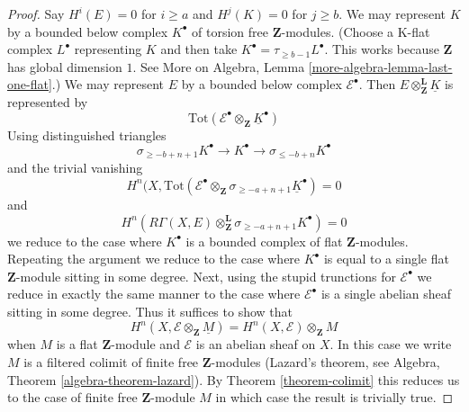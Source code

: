\documentclass[10pt,a4paper]{amsart}
\theoremstyle{plain}
\theoremstyle{definition}
\theoremstyle{remark}
\numberwithin{equation}{subsection}
\begin{document}
\begin{proof}
Say $H^i(E) = 0$ for $i \geq a$ and $H^j(K) = 0$ for $j \geq b$.
We may represent $K$ by a bounded below complex
$K^\bullet$ of torsion free $\mathbf{Z}$-modules.
(Choose a K-flat complex $L^\bullet$ representing $K$ and then
take $K^\bullet = \tau_{\geq b - 1}L^\bullet$. This works because
$\mathbf{Z}$ has global dimension $1$. See
More on Algebra, Lemma \ref{more-algebra-lemma-last-one-flat}.)
We may represent $E$ by a bounded below complex
$\mathcal{E}^\bullet$.
Then $E \otimes_\mathbf{Z}^\mathbf{L} \underline{K}$ is
represented by
$$
\text{Tot}(\mathcal{E}^\bullet \otimes_\mathbf{Z} \underline{K}^\bullet)
$$
Using distinguished triangles
$$
\sigma_{\geq -b + n + 1}K^\bullet
\to K^\bullet \to
\sigma_{\leq -b + n}K^\bullet
$$
and the trivial vanishing
$$
H^n(X,
\text{Tot}(\mathcal{E}^\bullet \otimes_\mathbf{Z}
\sigma_{\geq -a + n + 1}\underline{K}^\bullet) = 0
$$
and
$$
H^n(R\Gamma(X, E)
\otimes_\mathbf{Z}^\mathbf{L} \sigma_{\geq -a + n + 1}K^\bullet) = 0
$$
we reduce to the case where $K^\bullet$ is a bounded complex of
flat $\mathbf{Z}$-modules. Repeating the argument we reduce to the
case where $K^\bullet$ is equal to a single flat $\mathbf{Z}$-module
sitting in some degree. Next, using the stupid
trunctions for $\mathcal{E}^\bullet$
we reduce in exactly the same manner to the case where
$\mathcal{E}^\bullet$ is a single abelian sheaf sitting
in some degree. Thus it suffices to show that
$$
H^n(X, \mathcal{E} \otimes_\mathbf{Z} \underline{M}) =
H^n(X, \mathcal{E}) \otimes_\mathbf{Z} M
$$
when $M$ is a flat $\mathbf{Z}$-module and $\mathcal{E}$
is an abelian sheaf on $X$. In this case we
write $M$ is a filtered colimit of finite free $\mathbf{Z}$-modules
(Lazard's theorem, see Algebra, Theorem \ref{algebra-theorem-lazard}).
By Theorem \ref{theorem-colimit} this reduces us to the case of finite free
$\mathbf{Z}$-module $M$ in which case the result is trivially true.
\end{proof}
\end{document}
